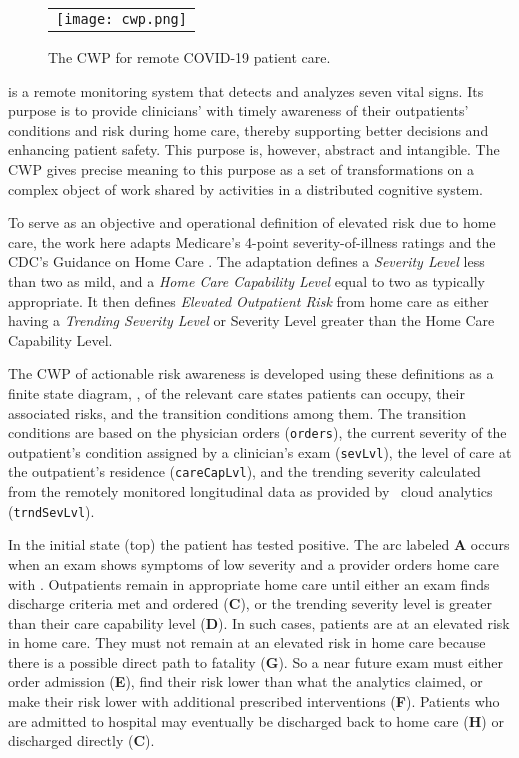 \begin{figure*}[t]
  \begin{center}
    \begin{tabular}{c}
      \texttt{[image: cwp.png]}
    \end{tabular}
  \end{center}
\caption{The CWP for remote COVID-19 patient care.}
\label{fig:cwp}
\end{figure*}

\phware is a remote monitoring system that detects and analyzes seven vital signs. Its purpose is to provide clinicians' with timely awareness of their outpatients' conditions and risk during home care, thereby supporting better decisions and enhancing patient safety. This purpose is, however, abstract and intangible. The CWP gives precise meaning to this purpose as a set of transformations on a complex object of work shared by activities in a distributed cognitive system.

To serve as an objective and operational definition of elevated risk due to home care, the work here adapts Medicare’s 4-point severity-of-illness ratings \cite{Hornbrook2005OverviewOD,severity} and the CDC’s Guidance on Home Care \cite{cdc}. The adaptation defines a \emph{Severity Level} less than two as mild, and a \emph{Home Care Capability Level} equal to two as typically appropriate. It then defines \emph{Elevated Outpatient Risk} from home care as either having a \emph{Trending Severity Level} or Severity Level greater than the Home Care Capability Level.

The CWP of actionable risk awareness is developed using these definitions as a finite state diagram, , of the relevant care states patients can occupy, their associated risks, and the transition conditions among them. The transition conditions are based on the physician orders (\texttt{orders}), the current severity of the outpatient’s condition assigned by a clinician’s exam (\texttt{sevLvl}), the level of care at the outpatient's residence (\texttt{careCapLvl}), and the trending severity calculated from the remotely monitored longitudinal data as provided by
\phware\ cloud analytics (\texttt{trndSevLvl}). 

In the initial state (top) the patient has tested positive. The arc labeled \textbf{A} occurs when an exam shows symptoms of low severity and a provider orders home care with \phware. Outpatients remain in appropriate home care until either an exam finds discharge criteria met and ordered (\textbf{C}), or the trending severity level is greater than their care capability level (\textbf{D}). In such cases, patients are at an elevated risk in home care. They must not remain at an elevated risk in home care because there is a possible direct path to fatality (\textbf{G}). So a near future exam must either order admission (\textbf{E}), find their risk lower than what the analytics claimed, or make their risk lower with additional prescribed interventions (\textbf{F}). Patients who are admitted to hospital may eventually be discharged back to home care (\textbf{H}) or discharged directly (\textbf{C}). 

